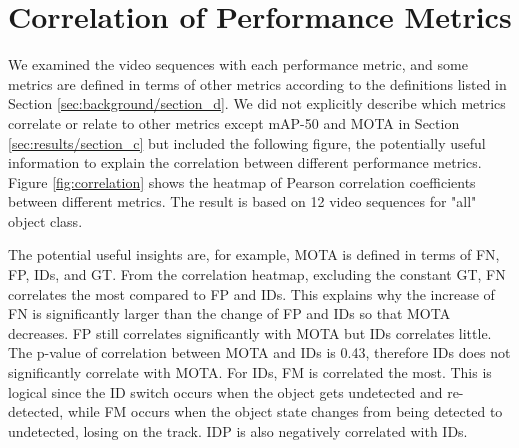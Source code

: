 \section{Correlation of Performance Metrics}
\label{sec:appendix/correlation}

We examined the video sequences with each performance metric, and some metrics are defined in terms of other metrics according to the definitions listed in Section \ref{sec:background/section_d}. We did not explicitly describe which metrics correlate or relate to other metrics except mAP-50 and MOTA in Section \ref{sec:results/section_c} but included the following figure, the potentially useful information to explain the correlation between different performance metrics. Figure \ref{fig:correlation} shows the heatmap of Pearson correlation coefficients between different metrics. The result is based on 12 video sequences for "all" object class.

The potential useful insights are, for example, MOTA is defined in terms of FN, FP, IDs, and GT. From the correlation heatmap, excluding the constant GT, FN correlates the most compared to FP and IDs. This explains why the increase of FN is significantly larger than the change of FP and IDs so that MOTA decreases. FP still correlates significantly with MOTA but IDs correlates little. The p-value of correlation between MOTA and IDs is 0.43, therefore IDs does not significantly correlate with MOTA. For IDs, FM is correlated the most. This is logical since the ID switch occurs when the object gets undetected and re-detected, while FM occurs when the object state changes from being detected to undetected, losing on the track. IDP is also negatively correlated with IDs.
